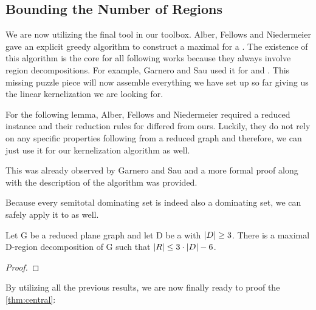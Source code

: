 \subsection{Bounding the Number of Regions}

We are now utilizing the final tool in our toolbox. Alber, Fellows and Niedermeier \cite[Proposition 1]{Alber2004} gave an explicit greedy algorithm to construct a maximal \dreg for a \dom. 
The existence of this algorithm is the core for all following works because they always involve region decompositions. For example, Garnero and Sau used it for \rbdom \cite{Garnero2017} and \tdom \cite{Garnero2018}. This missing puzzle piece will now assemble everything we have set up so far giving us the linear kernelization we are looking for.

For the following lemma, Alber, Fellows and Niedermeier\cite{Alber2004} required a reduced instance and their reduction rules for \pdom differed from ours. Luckily, they do not rely on any specific properties following from a reduced graph and therefore, we can just use it for our kernelization algorithm as well.

This was already observed by Garnero and Sau \cite{Garnero2018} and a more formal proof along with the description of the algorithm was provided.

Because every semitotal dominating set is indeed also a dominating set, we can safely apply it to \psdom as well. 

\begin{lemma}\label{lemma:numRegions}
    Let G be a reduced plane graph and let D be a \sdom with $\abs{D}\geq 3$. There is a maximal D-region decomposition of G such that $\abs{R} \leq 3 \cdot \abs{D} - 6$.
\end{lemma}

\begin{lemma}\label{lemma:runtime}
\end{lemma}
\begin{proof} 
\end{proof}

\noindent By utilizing all the previous results, we are now finally ready to proof the \cref{thm:central}: 

\centraltheo*

